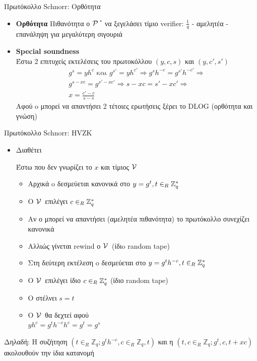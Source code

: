 \documentclass[10pt,handout]{beamer}
\begin{document}
\begin{frame}{Πρωτόκολλο Schnorr: Ορθότητα}
\begin{itemize}
\item \textbf{Ορθότητα} 
Πιθανότητα ο $\mathcal{P}\,$$^*$ να ξεγελάσει τίμιο verifier: $\frac{1}{q}$ - αμελητέα - επανάληψη για μεγαλύτερη σιγουριά
\pause
\item \textbf{Special soundness}\\
Έστω 2 επιτυχείς εκτελέσεις του πρωτοκόλλου $(y,c,s)$ και $(y,c',s')$
\pause
\begin{align*}
 g^s = yh^c  \text{ και }  g^{s'} = yh^{c'}  \Rightarrow  g^s h^{-c}   = g^{s'} h^{-c'}  \Rightarrow \\
 g^{s-xc} = g^{s'-xc'} \Rightarrow  s-xc = s'-xc' \Rightarrow \\
 x = \frac{c'-c}{s-s}
\end{align*}
\pause
Αφού o \prv μπορεί να απαντήσει 2 τέτοιες ερωτήσεις ξέρει το DLOG
(ορθότητα και γνώση)
\end{itemize}
\end{frame}


\begin{frame}{Πρωτόκολλο Schnorr: HVZK}
\begin{itemize}
\item Διαθέτει 

Έστω  \siml που δεν γνωρίζει το $x$ και τίμιος $\mathcal{V}\,$ 
\pause
\begin{itemize}
\item Αρχικά o \siml δεσμεύεται κανονικά στο $y=g^t, t \in_R \mathbb{Z}^*_{q}$
\pause
\item Ο $\mathcal{V}\,$ επιλέγει $c \in_R \mathbb{Z}^*_{q}$
\pause
\item Αν ο \siml μπορεί να απαντήσει (αμελητέα πιθανότητα) το πρωτόκολλο συνεχίζει κανονικά \pause
\item Αλλιώς γίνεται rewind ο $\mathcal{V}\,$ (ίδιo random tape) \pause
\item Στη δεύτερη εκτέλεση o \siml δεσμεύεται στο $y=g^t h^{-c}, t \in_R \mathbb{Z}^*_{q}$ \pause
\item Ο $\mathcal{V}\,$ επιλέγει ίδιο $c \in_R \mathbb{Z}^*_{q}$ (ίδιο random tape) \pause
\item O \siml στέλνει $s=t$ \pause
\item Ο $\mathcal{V}\,$ θα δεχτεί αφού \\
$yh^{c} = g^t  h^{-c} h^{c} = g^t = g^s$ \\
\end{itemize}
\end{itemize}
\pause
 
\begin{block}{Δηλαδή:}
Η συζήτηση $(t \in_R \mathbb{Z}_q; g^t h^{-c}   , c \in_R \mathbb{Z}_q  , t )$ 
 και η $(t,c \in_R \mathbb{Z}_q;  g^t  , c  , t+xc  )$
 ακολουθούν την ίδια κατανομή
 \end{block}
\end{frame}
\end{document}
